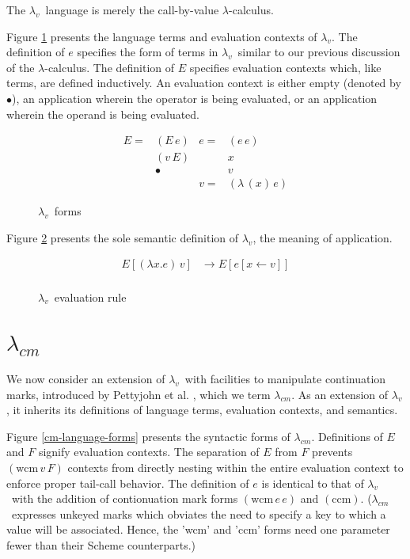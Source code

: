 \documentclass[ms,electronic,twosidetoc,letterpaper,chaptercenter,parttop]{byumsphd}
\newcommand{\lc}{$\lambda$-calculus}
\newcommand{\lv}{$\lambda_v$}
\newcommand{\cm}{$\lambda_{cm}$}
\newcommand{\abs}[2]{(\lambda\,(#1)\,#2)}
\newcommand{\app}[2]{(#1\,#2)}
\newcommand{\wcm}[2]{(\mathrm{wcm}\,#1\,#2)}
\newcommand{\ccm}{(\mathrm{ccm})}
\newcommand{\hole}{\bullet}
\begin{document}
The \lv\ language is merely the call-by-value \lc.

Figure \ref{lv-language-forms} presents the language terms and evaluation contexts of \lv.
The definition of $e$ specifies the form of terms in \lv\ similar to our previous
discussion of the \lc. The definition of $E$ specifies evaluation contexts which, like
terms, are defined inductively. An evaluation context is either empty (denoted by
$\hole$), an application wherein the operator is being evaluated, or an application
wherein the operand is being evaluated.

\begin{figure}
\begin{align*}
E = &\app{E}{e} & e = &\app{e}{e}\\
    &\app{v}{E} &     &x\\
    &\hole      &     &v\\
    &           & v = &\abs{x}{e}
\end{align*}
\caption{\lv\ forms}
\label{lv-language-forms}
\end{figure}

Figure \ref{lv-language-semantics} presents the sole semantic definition of \lv, the
meaning of application.

\begin{figure}
\begin{align*}
E[(\lambda x.e)\,v]     &\rightarrow E[e[x\leftarrow v]]\\
\end{align*}
\caption{\lv\ evaluation rule}
\label{lv-language-semantics}
\end{figure}

\section{\cm}

We now consider an extension of \lv\ with facilities to manipulate continuation 
marks, introduced by Pettyjohn et al. \cite{pettyjohn2005continuations}, which 
we term \cm. As an extension of \lv, it inherits its definitions of language 
terms, evaluation contexts, and semantics.

Figure \ref{cm-language-forms} presents the syntactic forms of \cm.  Definitions of $E$
and $F$ signify evaluation contexts. The separation of $E$ from $F$ prevents $\wcm{v}{F}$
contexts from directly nesting within the entire evaluation context to enforce proper
tail-call behavior. The definition of $e$ is identical to that of \lv\ with the addition
of contionuation mark forms $\wcm{e}{e}$ and $\ccm$. (\cm\ expresses unkeyed marks which
obviates the need to specify a key to which a value will be associated. Hence, the
\scheme'wcm' and \scheme'ccm' forms need one parameter fewer than their Scheme
counterparts.)
\end{document}
